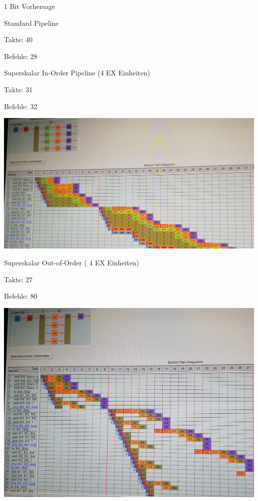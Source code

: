 \documentclass[a4paper,12pt,titlepage]{scrartcl}
\begin{document}
1 Bit Vorhersage
\begin{itemize*}
    \item Standard Pipeline
    \begin{itemize*}
        \item Takte: 40
        \item Befehle: 28
    \end{itemize*}
    \item Superskalar In-Order Pipeline (4 EX Einheiten)
    \begin{itemize*}
        \item Takte: 31
        \item Befehle: 32
        \item \includegraphics[width=.4\linewidth]{Assets/RA2-64222.jpg}
    \end{itemize*}
    \item Superskalar Out-of-Order ( 4 EX Einheiten)
    \begin{itemize*}
        \item Takte: 27
        \item Befehle: 80
        \item \includegraphics[width=.4\linewidth]{Assets/RA2-64400.jpg}
    \end{itemize*}
\end{itemize*}
\end{document}
